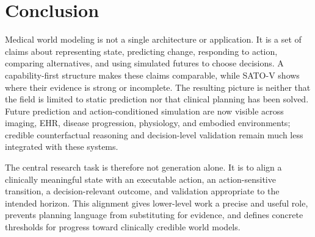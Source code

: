 \section{Conclusion}
\label{sec:conclusion}

Medical world modeling is not a single architecture or application. It is a set of claims about representing state, predicting change, responding to action, comparing alternatives, and using simulated futures to choose decisions. A capability-first structure makes these claims comparable, while SATO-V shows where their evidence is strong or incomplete. The resulting picture is neither that the field is limited to static prediction nor that clinical planning has been solved. Future prediction and action-conditioned simulation are now visible across imaging, EHR, disease progression, physiology, and embodied environments; credible counterfactual reasoning and decision-level validation remain much less integrated with these systems.

The central research task is therefore not generation alone. It is to align a clinically meaningful state with an executable action, an action-sensitive transition, a decision-relevant outcome, and validation appropriate to the intended horizon. This alignment gives lower-level work a precise and useful role, prevents planning language from substituting for evidence, and defines concrete thresholds for progress toward clinically credible world models.
